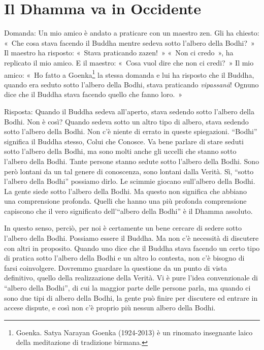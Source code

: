 \chapter{Il Dhamma va in Occidente}

Domanda: Un mio amico è andato a praticare con un maestro zen. Gli ha
chiesto: «~Che cosa stava facendo il Buddha mentre sedeva sotto l'albero
della Bodhi?~» Il maestro ha risposto: «~Stava praticando zazen!~» «~Non
ci credo~», ha replicato il mio amico. E il maestro: «~Cosa vuol dire
che non ci credi?~» Il mio amico: «~Ho fatto a Goenka\footnote{Goenka.
  Satya Narayan Goenka (1924-2013) è un rinomato insegnante laico della
  meditazione di tradizione birmana.} la stessa domanda e lui ha
risposto che il Buddha, quando era seduto sotto l'albero della Bodhi,
stava praticando \emph{vipassanā}! Ognuno dice che il Buddha stava
facendo quello che fanno loro.~»

Risposta: Quando il Buddha sedeva all'aperto, stava sedendo sotto
l'albero della Bodhi. Non è così? Quando sedeva sotto un altro tipo di
albero, stava sedendo sotto l'albero della Bodhi. Non c'è niente di
errato in queste spiegazioni. ``Bodhi'' significa il Buddha stesso,
Colui che Conosce. Va bene parlare di stare seduti sotto l'albero della
Bodhi, ma sono molti anche gli uccelli che stanno sotto l'albero della
Bodhi. Tante persone stanno sedute sotto l'albero della Bodhi. Sono però
lontani da un tal genere di conoscenza, sono lontani dalla Verità. Sì,
``sotto l'albero della Bodhi'' possiamo dirlo. Le scimmie giocano
sull'albero della Bodhi. La gente siede sotto l'albero della Bodhi. Ma
questo non significa che abbiano una comprensione profonda. Quelli che
hanno una più profonda comprensione capiscono che il vero significato
dell'``albero della Bodhi'' è il Dhamma assoluto.

In questo senso, perciò, per noi è certamente un bene cercare di sedere
sotto l'albero della Bodhi. Possiamo essere il Buddha. Ma non c'è
necessità di discutere con altri in proposito. Quando uno dice che il
Buddha stava facendo un certo tipo di pratica sotto l'albero della Bodhi
e un altro lo contesta, non c'è bisogno di farsi coinvolgere. Dovremmo
guardare la questione da un punto di vista definitivo, quello della
realizzazione della Verità. Vi è pure l'idea convenzionale di ``albero
della Bodhi'', di cui la maggior parte delle persone parla, ma quando ci
sono due tipi di albero della Bodhi, la gente può finire per discutere
ed entrare in accese dispute, e così non c'è proprio più nessun albero
della Bodhi.

